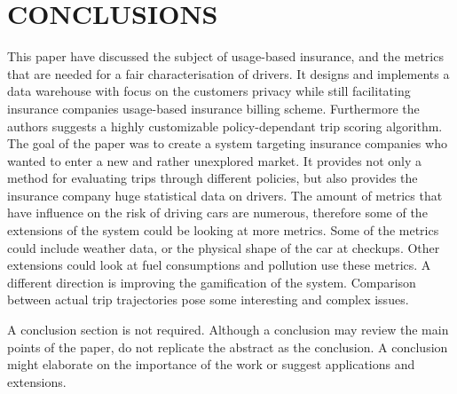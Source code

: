 \section{CONCLUSIONS}

This paper have discussed the subject of usage-based insurance, and the metrics that are needed for a fair characterisation of drivers. It designs and implements a data warehouse with focus on the customers privacy while still facilitating insurance companies usage-based insurance billing scheme. Furthermore the authors suggests a highly customizable policy-dependant trip scoring algorithm.
The goal of the paper was to create a system targeting insurance companies who wanted to enter a new and rather unexplored market. It provides not only a method for evaluating trips through different policies, but also provides the insurance company huge statistical data on drivers.
The amount of metrics that have influence on the risk of driving cars are numerous, therefore some of the extensions of the system could be looking at more metrics. Some of the metrics could include weather data, or the physical shape of the car at checkups. Other extensions could look at fuel consumptions and pollution use these metrics.
A different direction is improving the gamification of the system. Comparison between actual trip trajectories pose some interesting and complex issues.





A conclusion section is not required. Although a conclusion may review the main points of the paper, do not replicate the abstract as the conclusion. A conclusion might elaborate on the importance of the work or suggest applications and extensions. 

\addtolength{\textheight}{-12cm}   %
